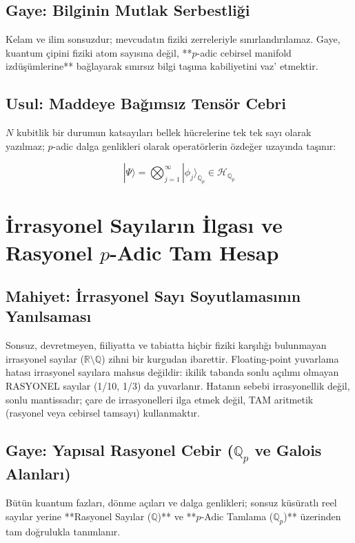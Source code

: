 \documentclass[11pt, a4paper]{article}
\begin{document}
\subsection{Gaye: Bilginin Mutlak Serbestliği}
Kelam ve ilim sonsuzdur; mevcudatın fiziki zerreleriyle sınırlandırılamaz. Gaye, kuantum çipini fiziki atom sayısına değil, **$p$-adic cebirsel manifold izdüşümlerine** bağlayarak sınırsız bilgi taşıma kabiliyetini vaz' etmektir.

\subsection{Usul: Maddeye Bağımsız Tensör Cebri}
$N$ kubitlik bir durumun katsayıları bellek hücrelerine tek tek sayı olarak yazılmaz; $p$-adic dalga genlikleri olarak operatörlerin özdeğer uzayında taşınır:

\begin{equation}
|\Psi\rangle = \bigotimes_{j=1}^{\infty} |\phi_j\rangle_{\mathbb{Q}_p} \in \mathcal{H}_{\mathbb{Q}_p}
\end{equation}

\section{İrrasyonel Sayıların İlgası ve Rasyonel $p$-Adic Tam Hesap}

\subsection{Mahiyet: İrrasyonel Sayı Soyutlamasının Yanılsaması}
Sonsuz, devretmeyen, fiiliyatta ve tabiatta hiçbir fiziki karşılığı bulunmayan irrasyonel sayılar ($\mathbb{R} \setminus \mathbb{Q}$) zihni bir kurgudan ibarettir. Floating-point yuvarlama hatası irrasyonel sayılara mahsus değildir: ikilik tabanda sonlu açılımı olmayan RASYONEL sayılar (1/10, 1/3) da yuvarlanır. Hatanın sebebi irrasyonellik değil, sonlu mantissadır; çare de irrasyonelleri ilga etmek değil, TAM aritmetik (rasyonel veya cebirsel tamsayı) kullanmaktır.

\subsection{Gaye: Yapısal Rasyonel Cebir ($\mathbb{Q}_p$ ve Galois Alanları)}
Bütün kuantum fazları, dönme açıları ve dalga genlikleri; sonsuz küsüratlı reel sayılar yerine **Rasyonel Sayılar ($\mathbb{Q}$)** ve **$p$-Adic Tamlama ($\mathbb{Q}_p$)** üzerinden tam doğrulukla tanımlanır.
\end{document}
